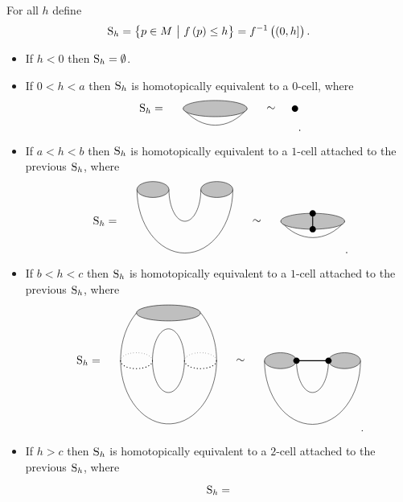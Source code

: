 \begin{example}
For all $ h $ define
$$ \S_h = \cbr{p \in M \st f\br{p} \le h} = f^{-1}\br{\intoc{0, h}}. $$
\begin{itemize}
\item If $ h < 0 $ then $ \S_h = \emptyset $.
\item If $ 0 < h < a $ then $ \S_h $ is homotopically equivalent to a $ 0 $-cell, where
$$
\begin{tikzpicture}
\draw (-2, 0) node{$ \S_h = $};
\draw (-1, 0) arc (-132:-48:1.5 and 2);
\draw [fill=lightgray] (0, 0) ellipse (1 and 0.25);
\draw (1.75, 0) node{$ \sim $};
\fill (2.5, 0) circle (0.1);
\end{tikzpicture}.
$$
\item If $ a < h < b $ then $ \S_h $ is homotopically equivalent to a $ 1 $-cell attached to the previous $ \S_h $, where
$$
\begin{tikzpicture}
\draw (-2.5, 0) node{$ \S_h = $};
\draw (-1.5, 1) arc (-180:0:1.5 and 2);
\draw (-0.5, 1) arc (-180:0:0.5 and 1);
\draw [fill=lightgray] (-1, 1) ellipse (0.5 and 0.25);
\draw [fill=lightgray] (1, 1) ellipse (0.5 and 0.25);
\draw (2.25, 0) node{$ \sim $};
\draw (3, 0) arc (-132:-48:1.5 and 2);
\draw [fill=lightgray] (4, 0) ellipse (1 and 0.25);
\fill (4, -0.25) circle (0.1);
\fill (4, 0.25) circle (0.1);
\draw [thick] (4, -0.25) to (4, 0.25);
\end{tikzpicture}.
$$
\item If $ b < h < c $ then $ \S_h $ is homotopically equivalent to a $ 1 $-cell attached to the previous $ \S_h $, where
$$
\begin{tikzpicture}
\draw (-2.5, 0) node{$ \S_h = $};
\draw (-1, 1.5) arc (-228:48:1.5 and 2);
\draw (0, 0) ellipse (0.5 and 1);
\draw [fill=lightgray] (0, 1.5) ellipse (1 and 0.25);
\draw [dotted, thick] (-1.5, 0) arc (-180:0:0.5 and 0.25);
\draw [dotted, thick] (0.5, 0) arc (-180:0:0.5 and 0.25);
\draw [dotted] (-1.5, 0) arc (180:0:0.5 and 0.25);
\draw [dotted] (0.5, 0) arc (180:0:0.5 and 0.25);
\draw (2.25, 0) node{$ \sim $};
\draw (3, 0) arc (-180:0:1.5 and 2);
\draw (4, 0) arc (-180:0:0.5 and 1);
\draw [fill=lightgray] (3.5, 0) ellipse (0.5 and 0.25);
\draw [fill=lightgray] (5.5, 0) ellipse (0.5 and 0.25);
\fill (4, 0) circle (0.1);
\fill (5, 0) circle (0.1);
\draw [thick] (4, 0) to (5, 0);
\end{tikzpicture}.
$$
\item If $ h > c $ then $ \S_h $ is homotopically equivalent to a $ 2 $-cell attached to the previous $ \S_h $, where
$$
\begin{tikzpicture}
\draw (-2.5, 0) node{$ \S_h = $};

\end{tikzpicture}$$
\end{itemize}
\end{example}
